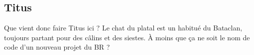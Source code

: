 \subsection{Titus}

\label{titus}
Que vient donc faire Titus ici ? Le chat du platal est un habitué du Bataclan, toujours partant pour des câlins et des siestes. À moins que ça ne soit le nom de code d'un nouveau projet du BR ?

